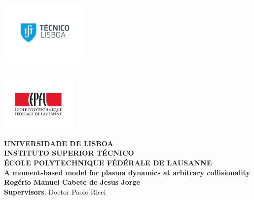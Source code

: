 \begin{titlepage}
\thispagestyle{empty}
\begin{flushleft}
    ~\\ \vspace{-20mm} \hspace{-8mm}  \includegraphics[width=44mm]{images/istnewlogo} 
\end{flushleft}
\begin{flushright}
    ~\\ \vspace{-28mm} \hspace{-5mm}  \includegraphics[width=37mm]{images/epfl}
\end{flushright}
\vspace{0mm} 
\centering
{\LARGE \textbf{
UNIVERSIDADE DE LISBOA\\\vspace{0.0cm}INSTITUTO SUPERIOR TÉCNICO
\vspace{3mm}
\\ \vspace{0.3cm}ÉCOLE POLYTECHNIQUE FÉDÉRALE DE LAUSANNE
}}
~\\ \vspace{5mm} %
\LARGE \textbf{A moment-based model for plasma dynamics at arbitrary collisionality}
\\ \vspace{4mm}
\Large \textbf{Rogério Manuel Cabete de Jesus Jorge}
\\ \vspace{4mm}
\hspace{-2.5cm}\large \textbf{Supervisors}: Doctor Paolo Ricci

\end{titlepage}
